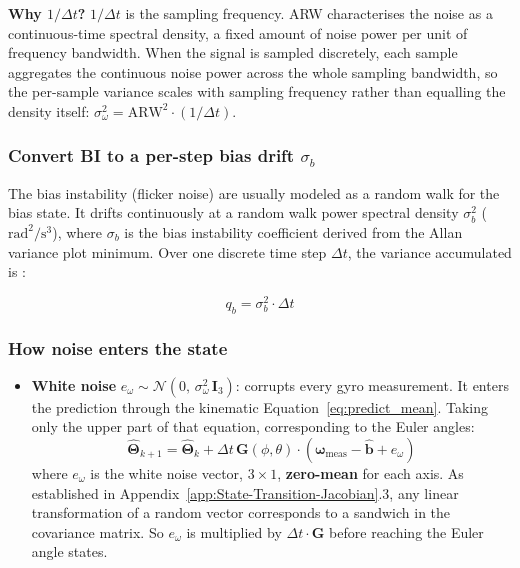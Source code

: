 \documentclass[12pt,a4paper]{article}
\newcommand{\bG}{\bm{G}}
\newcommand{\bomega}{\bm{\omega}}
\newcommand{\bTheta}{\bm{\Theta}}
\begin{document}
{\textbf{Why $1/\Delta t$?} $1/\Delta t$ is the sampling frequency.
ARW characterises the noise as a continuous-time spectral density, a
fixed amount of noise power per unit of frequency bandwidth. When
the signal is sampled discretely, each sample aggregates the
continuous noise power across the whole sampling bandwidth, so the
per-sample variance scales with sampling frequency rather than
equalling the density itself: $\sigma_\omega^2 = \mathrm{ARW}^2
\cdot (1/\Delta t)$.

\subsubsection{Convert BI to a per-step bias drift
\texorpdfstring{$\sigma_b$}{sigma\_b}}

The bias instability (flicker noise) are usually modeled as a random walk for the bias state. It drifts continuously at a random walk power spectral density $\sigma_b^2$ ($\text{rad}^2/\text{s}^3$), where $\sigma_b$ is the bias instability coefficient derived from the Allan variance plot minimum. Over one discrete time step $\Delta t$, the variance accumulated is \citep{woodman2007introduction}:

\begin{equation}
  q_b = \sigma_b^2 \cdot \Delta t
  \label{eq:qb}
\end{equation}



\subsubsection{How noise enters the state}

\begin{itemize}
  \item \textbf{White noise} $e_\omega \sim \mathcal{N}(0,\,\sigma_\omega^2\,\bm{I}_3)$:
        corrupts every gyro measurement. It enters the prediction through the
        kinematic Equation~\eqref{eq:predict_mean}. Taking only the upper
        part of that equation, corresponding to the Euler angles:
        \[
         \hat{\bTheta}_{k+1} = \hat{\bTheta}_k +
         \Delta t\,\bG(\phi,\theta) \cdot (\bomega_\text{meas} - \hat{\bm{b}} + e_\omega)
        \]
        where $e_\omega$ is the white noise vector, $3\times 1$,
        \textbf{zero-mean} for each axis. As established in
        Appendix~\ref{app:State-Transition-Jacobian}.3, any linear
        transformation of a random vector corresponds to a sandwich
        in the covariance matrix. So $e_\omega$ is multiplied by
        $\Delta t \cdot \bG$ before reaching the Euler angle states.


\end{itemize}}
\end{document}
